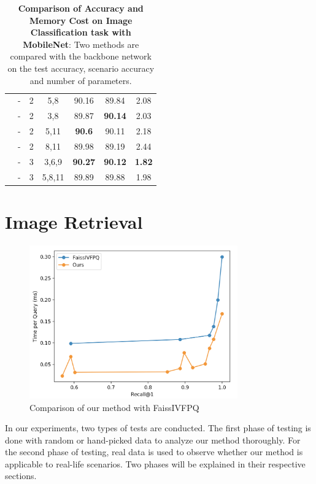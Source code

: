 \begin{table}[]
\begin{center}
\begin{tabular}{c||c|c|c||c|c|c}
\cline{2-7} 
& - & 2 & 5,8 & 90.16 & 89.84 & 2.08 \\ 
\cline{2-7} 
& - & 2 & 3,8 & 89.87 & \textbf{90.14} & 2.03 \\ 
\cline{2-7} 
& - & 2 & 5,11 & \textbf{90.6} & 90.11 & 2.18 \\ 
\cline{2-7} 
& - & 2 & 8,11 & 89.98 & 89.19 & 2.44 \\ 
\cline{2-7} 
& - & 3 & 3,6,9 & \textbf{90.27} & \textbf{90.12} & \textbf{1.82} \\ 
\cline{2-7} 
& - & 3 & 5,8,11 & 89.89 & 89.88 & 1.98                                                                   
\end{tabular}
\end{center}
\caption[Comparison of Accuracy and Memory Cost on Image Classification task with VGG16]{\textbf{Comparison of Accuracy and Memory Cost on Image Classification task with MobileNet}: Two methods are compared with the backbone network on the test accuracy, scenario accuracy and number of parameters.}
\label{ic-mobilenetcifar10}
\end{table}


\section{Image Retrieval}

\begin{figure}
    \centering
    \includegraphics[width=0.8\textwidth]{thesis/images/ret_first_result_fixed-fig.png}
    \caption{Comparison of our method with FaissIVFPQ}
    \label{fig:ret-res-1}
\end{figure}


In our experiments, two types of tests are conducted. 
The first phase of testing is done with random or hand-picked data to analyze our method thoroughly. 
For the second phase of testing, real data is used to observe whether our method is applicable to real-life scenarios. 
Two phases will be explained in their respective sections.

